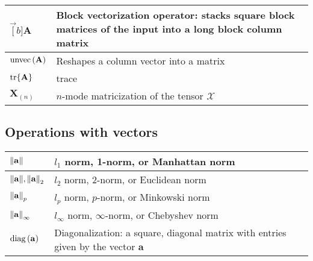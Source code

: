 \documentclass{article}
\begin{document}
\begin{xltabular}{\textwidth}{XX}
    \(\vec[b]{\mathbf{A}}\)                                           & Block vectorization operator: stacks square block matrices of the input into a long block column matrix\\ \hline
    \(\operatorname{unvec}\left(\mathbf{A}\right)\)                                            & Reshapes a column vector into a matrix\\ \hline
    \(\tr{\mathbf{A}}\)                                               & trace\\ \hline
    \(\mathbf{X}_{(n)}\)                                              & \(n\)-mode matricization of the tensor \(\bm{\mathcal{X}}\)\\
\end{xltabular}
\subsection{Operations with vectors}
\begin{xltabular}{\textwidth}{XX}
    \(\norm{\mathbf{a}}\)                         & \(l_1\) norm, 1-norm, or Manhattan norm\\ \hline
    \(\norm{\mathbf{a}}, \norm{\mathbf{a}}_2\)    & \(l_2\) norm, 2-norm, or Euclidean norm\\ \hline
    \(\norm{\mathbf{a}}_p\)                       & \(l_p\) norm, \(p\)-norm, or Minkowski norm\\ \hline
    \(\norm{\mathbf{a}}_\infty\)                  & \(l_\infty\) norm, \(\infty\)-norm, or Chebyshev norm\\ \hline
    \(\operatorname{diag}\left(\mathbf{a}\right)\)                         & Diagonalization: a square, diagonal matrix with entries given by the vector \(\mathbf{a}\)\\
\end{xltabular}
\end{document}
